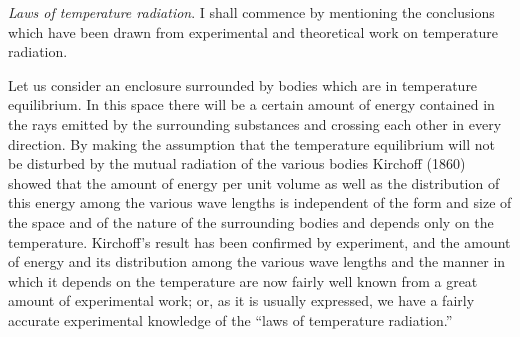 \emph{Laws of temperature radiation}. I shall commence by mentioning the
conclusions which have been drawn from experimental and theoretical work
on temperature radiation.

Let us consider an enclosure surrounded by bodies which are in
temperature equilibrium. In this space there will be a certain amount of
energy contained in the rays emitted by the surrounding substances and
crossing each other in every direction. By making the assumption that
the temperature equilibrium will not be disturbed by the mutual
radiation of the various bodies Kirchoff (1860) showed that the amount
of energy per unit volume as well as the distribution of this energy
among the various wave lengths is independent of the form and size of
the space and of the nature of the surrounding bodies and depends only
on the temperature. Kirchoff's result has been confirmed by experiment,
and the amount of energy and its distribution among the various wave
lengths and the manner in which it depends on the temperature are now
fairly well known from a great amount of experimental work; or, as it is
usually expressed, we have a fairly accurate experimental knowledge of
the ``laws of temperature radiation.''

